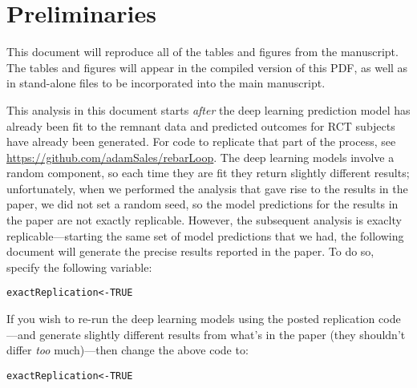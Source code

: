 \documentclass[12pt]{article}\usepackage[]{graphicx}\usepackage[]{xcolor}
\makeatletter
\newcommand{\hlnum}[1]{\textcolor[rgb]{0.686,0.059,0.569}{#1}}%
\newcommand{\hlstd}[1]{\textcolor[rgb]{0.345,0.345,0.345}{#1}}%
\newcommand{\hlkwb}[1]{\textcolor[rgb]{0.69,0.353,0.396}{#1}}%
\newenvironment{kframe}{%
 \def\at@end@of@kframe{}%
 \ifinner\ifhmode%
  \def\at@end@of@kframe{\end{minipage}}%
  \begin{minipage}{\columnwidth}%
 \fi\fi%
 \def\FrameCommand##1{\hskip\@totalleftmargin \hskip-\fboxsep
 \colorbox{shadecolor}{##1}\hskip-\fboxsep
     \hskip-\linewidth \hskip-\@totalleftmargin \hskip\columnwidth}%
 \MakeFramed {\advance\hsize-\width
   \@totalleftmargin\z@ \linewidth\hsize
   \@setminipage}}%
 {\par\unskip\endMakeFramed%
 \at@end@of@kframe}
\newenvironment{knitrout}{}{} %
\makeatother
\begin{document}
\section{Preliminaries}

This document will reproduce all of the tables and figures from the
manuscript. The tables and figures will appear in the compiled version
of this PDF, as well as in stand-alone files to be incorporated into
the main manuscript.


This analysis in this document starts \emph{after} the deep learning prediction model has already been fit to the remnant data and predicted outcomes for RCT subjects have already been generated. For code to replicate that part of the process, see \url{https://github.com/adamSales/rebarLoop}. 
The deep learning models involve a random component, so each time they are fit they return slightly different results; unfortunately, when we performed the analysis that gave rise to the results in the paper, we did not set a random seed, so the model predictions for the results in the paper are not exactly replicable. 
However, the subsequent analysis is exaclty replicable---starting the same set of model predictions that we had, the following document will generate the precise results reported in the paper. 
To do so, specify the following variable:

\begin{knitrout}
\color{fgcolor}\begin{kframe}
\begin{alltt}
\hlstd{exactReplication} \hlkwb{<-} \hlnum{TRUE}
\end{alltt}
\end{kframe}
\end{knitrout}

If you wish to re-run the deep learning models using the posted replication code---and generate slightly different results from what's in the paper (they shouldn't differ \emph{too} much)---then change the above code to:

\begin{knitrout}
\color{fgcolor}\begin{kframe}
\begin{alltt}
\hlstd{exactReplication} \hlkwb{<-} \hlnum{TRUE}
\end{alltt}
\end{kframe}
\end{knitrout}
\end{document}
